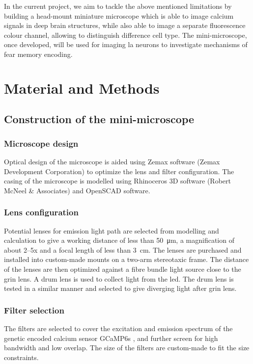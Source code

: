     In the current project, we aim to tackle the above mentioned limitations by building a head-mount miniature microscope which is able to image calcium signals in deep brain structures, while also able to image a separate fluorescence colour channel, allowing to distinguish difference cell type. The mini-microscope, once developed, will be used for imaging \gls{la} neurons to investigate mechanisms of fear memory encoding.


\section{Material and Methods}

\subsection{Construction of the mini-microscope}

\subsubsection{Microscope design}
Optical design of the microscope is aided using Zemax software (Zemax Development Corporation) to optimize the lens and filter configuration. The casing of the microscope is modelled using Rhinoceros 3D software (Robert McNeel \& Associates) and OpenSCAD software. 

\subsubsection{Lens configuration}
Potential lenses for emission light path are selected from modelling and calculation to give a working distance of less than \SI{50}{\um}, a magnification of about 2--5x and a focal length of less than \SI{3}{\cm}. The lenses are purchased and installed into custom-made mounts on a two-arm stereotaxic frame. The distance of the lenses are then optimized against a fibre bundle light source close to the \gls{grin} lens. A drum lens is used to collect light from the \gls{led}. The drum lens is tested in a similar manner and selected to give diverging light after \gls{grin} lens.

\subsubsection{Filter selection}
The filters are selected to cover the excitation and emission spectrum of the genetic encoded calcium sensor GCaMP6s \citep{chen13}, and further screen for high bandwidth and low overlap. The size of the filters are custom-made to fit the size constraints.

